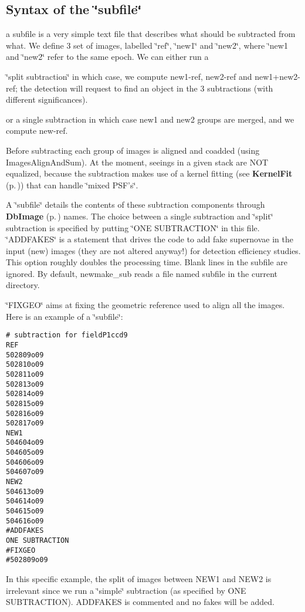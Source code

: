 \subsection{Syntax of the \char`\"{}subfile\char`\"{}}\label{subfile}
a subfile is a very simple text file that describes what should be  subtracted from what. We define 3 set of images, labelled \char`\"{}ref\char`\"{}, \char`\"{}new1\char`\"{} and \char`\"{}new2\char`\"{}, where \char`\"{}new1 and \char`\"{}new2\char`\"{} refer to the same epoch. We can either run a

\begin{CompactItemize}
\item 
\char`\"{}split subtraction\char`\"{} in which case, we compute new1-ref, new2-ref and new1+new2-ref; the detection will request to find an object in the 3 subtractions (with different significances). \item 
or a single subtraction in which case new1 and new2 groups are merged, and we compute new-ref.\end{CompactItemize}
Before subtracting each group of images is aligned and coadded (using Images\-Align\-And\-Sum). At the moment, seeings in a given stack are  NOT equalized, because the subtraction makes use of a kernel fitting (see {\bf Kernel\-Fit} {\rm (p.\,\pageref{class_kernelfit})}) that can handle \char`\"{}mixed PSF's\char`\"{}.

A \char`\"{}subfile\char`\"{} details the contents of these subtraction components through {\bf Db\-Image} {\rm (p.\,\pageref{class_dbimage})} names. The choice between a single subtraction and \char`\"{}split\char`\"{} subtraction is specified by putting \char`\"{}ONE SUBTRACTION\char`\"{} in this file. \char`\"{}ADDFAKES\char`\"{} is a  statement that drives the code to add fake supernovae in the input (new) images (they are not altered anyway!) for detection efficiency studies. This option roughly doubles the processing time. Blank lines in the subfile are ignored. By default, newmake\_\-sub reads a file named subfile in the current directory.

\char`\"{}FIXGEO\char`\"{} aims at fixing the geometric reference used to align all the images. Here is an example of a \char`\"{}subfile\char`\"{}:

\footnotesize\begin{verbatim}# subtraction for fieldP1ccd9
REF
502809o09
502810o09
502811o09
502813o09
502814o09
502815o09
502816o09
502817o09
NEW1
504604o09
504605o09
504606o09
504607o09
NEW2
504613o09
504614o09
504615o09
504616o09
#ADDFAKES
ONE SUBTRACTION
#FIXGEO
#502809o09\end{verbatim}\normalsize 


In this specific example, the split of images between NEW1 and NEW2 is irrelevant since we run a \char`\"{}simple\char`\"{} subtraction (as specified by ONE SUBTRACTION). ADDFAKES is commented and no fakes will be added.

